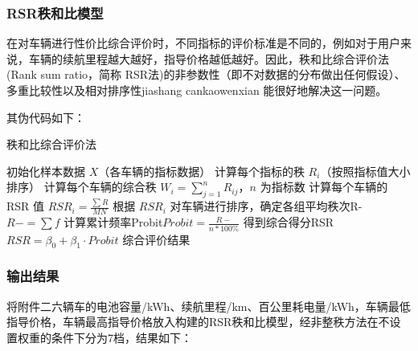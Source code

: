 \documentclass[withoutpreface,bwprint]{cumcmthesis} %
\begin{document}
\begin{table}[htbp]
\centering
{}
\end{table}

\subsubsection{RSR秩和比模型}

在对车辆进行性价比综合评价时，不同指标的评价标准是不同的，例如对于用户来说，车辆的续航里程越大越好，指导价格越低越好。因此，秩和比综合评价法 (Rank sum ratio，简称 RSR法)的非参数性（即不对数据的分布做出任何假设）、多重比较性以及相对排序性jiashang cankaowenxian 能很好地解决这一问题。

其伪代码如下：
\begin{algorithm}[H]
\caption{秩和比综合评价法}
\begin{algorithmic}[1]
   \State 初始化样本数据 $X$（各车辆的指标数据）
   \State 计算每个指标的秩 $R_i$（按照指标值大小排序）
   \State 计算每个车辆的综合秩 $W_i = \sum_{j=1}^{n} R_{ij}$，$n$ 为指标数
   \State 计算每个车辆的 RSR 值 $RSR_i = \frac{\sum R}{MN}$
   \State 根据 $RSR_i$ 对车辆进行排序，确定各组平均秩次R-$ R - = {\sum f}$
   \State 计算累计频率Probit$Probit =\frac{ R-}{n*100\%}$
   \State 得到综合得分RSR$RSR = \beta_0 + \beta_1 \cdot Probit$
   \State \Return 综合评价结果
\EndProcedure
\end{algorithmic}
\end{algorithm}

\subsubsection{输出结果}
将附件二六辆车的电池容量/kWh、续航里程/km、百公里耗电量/kWh，车辆最低指导价格，车辆最高指导价格放入构建的RSR秩和比模型，经非整秩方法在不设置权重的条件下分为7档，结果如下：
\end{document}
